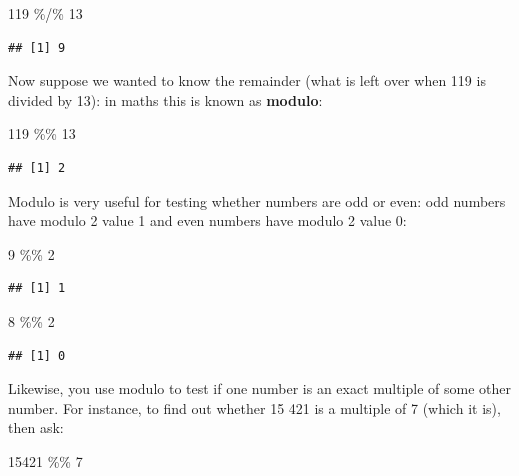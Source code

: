 \documentclass[
]{book}
\newenvironment{Shaded}{\begin{snugshade}}{\end{snugshade}}
\newcommand{\DecValTok}[1]{\textcolor[rgb]{0.00,0.00,0.81}{#1}}
\newcommand{\SpecialCharTok}[1]{\textcolor[rgb]{0.00,0.00,0.00}{#1}}
\theoremstyle{definition}
\theoremstyle{definition}
\theoremstyle{definition}
\theoremstyle{definition}
\theoremstyle{remark}
\begin{document}
\begin{Shaded}
\begin{Highlighting}[]
\DecValTok{119} \SpecialCharTok{\%/\%} \DecValTok{13}
\end{Highlighting}
\end{Shaded}

\begin{verbatim}
## [1] 9
\end{verbatim}

Now suppose we wanted to know the remainder (what is left over when 119 is divided by 13): in maths this is known as \textbf{modulo}:

\begin{Shaded}
\begin{Highlighting}[]
\DecValTok{119} \SpecialCharTok{\%\%} \DecValTok{13}
\end{Highlighting}
\end{Shaded}

\begin{verbatim}
## [1] 2
\end{verbatim}

Modulo is very useful for testing whether numbers are odd or even: odd numbers have modulo 2 value 1 and even numbers have modulo 2 value 0:

\begin{Shaded}
\begin{Highlighting}[]
\DecValTok{9} \SpecialCharTok{\%\%} \DecValTok{2}
\end{Highlighting}
\end{Shaded}

\begin{verbatim}
## [1] 1
\end{verbatim}

\begin{Shaded}
\begin{Highlighting}[]
\DecValTok{8} \SpecialCharTok{\%\%} \DecValTok{2}
\end{Highlighting}
\end{Shaded}

\begin{verbatim}
## [1] 0
\end{verbatim}

Likewise, you use modulo to test if one number is an exact multiple of some other number. For instance, to find out whether 15 421 is a multiple of 7 (which it is), then ask:

\begin{Shaded}
\begin{Highlighting}[]
\DecValTok{15421} \SpecialCharTok{\%\%} \DecValTok{7}
\end{Highlighting}
\end{Shaded}
\end{document}
